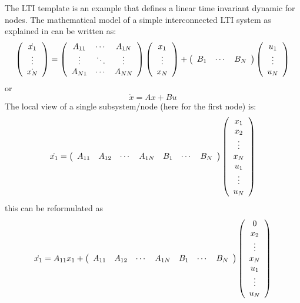 \documentclass[a4paper,twoside, openright,12pt]{report}
\begin{document}
The LTI template is an example that defines a linear time invariant dynamic for nodes. The mathematical model 
of a simple interconnected LTI system as explained in \cite{LargeScaleSystems} can be written as:
\begin{eqnarray}
\left( \begin{array}{c}
\dot{x_1} \\  
\vdots \\
\dot{x_N}
\end{array} \right)=
\left( \begin{array}{ccc}
A_{11} & \cdots & A_{1N} \\  
\vdots & \ddots & \vdots\\
A_{N1} & \cdots &A_{NN}
\end{array} \right) 
\left( \begin{array}{c}
x_1 \\  
\vdots \\
x_N
\end{array} \right)+
\left( \begin{array}{c c c}
B_{1} & \cdots & B_{N}  
\end{array} \right) 
\left( \begin{array}{c}
u_1 \\  
\vdots \\
u_N
\end{array} \right)       
\end{eqnarray}
or
\begin{equation}
 \dot{x}=Ax+Bu
\end{equation}
The local view of a single subsystem/node (here for the first node) is:
\begin{eqnarray}
  \dot{x_1}= 
\left( \begin{array}{c c c c c c c}
A_{11} & A_{12} & \cdots & A_{1N} & B_{1} & \cdots & B_{N}  
\end{array} \right) 
\left( \begin{array}{c}
x_1 \\ 
x_2 \\ 
\vdots \\
x_N\\
u_1 \\  
\vdots \\
u_N
\end{array} \right)    
\end{eqnarray}
this can be reformulated as
\begin{eqnarray} \label{LTIFor}
 \dot{x_1}= A_{11}x_1 +  
\left( \begin{array}{c c c c c c c}
A_{11} & A_{12} & \cdots & A_{1N} & B_{1} & \cdots & B_{N}  
\end{array} \right) 
\left( \begin{array}{c}
0 \\ 
x_2 \\ 
\vdots \\
x_N\\
u_1 \\  
\vdots \\
u_N
\end{array} \right) 
\end{eqnarray}
\end{document}
